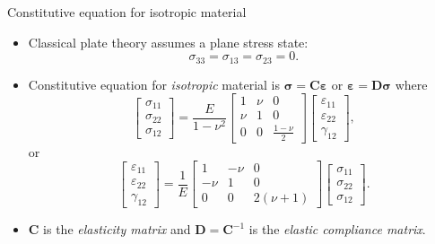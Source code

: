 \documentclass[aspectratio=169]{beamer}
\begin{document}
\begin{frame}{Constitutive equation for isotropic material}
  \vspace{-0.3cm}
  \begin{itemize}
    \item  Classical plate theory assumes a plane stress state:  $$\sigma_{33} = \sigma_{13} =\sigma_{23} =0.$$
    \item  Constitutive equation for \emph{isotropic} material is $\boldsymbol{\sigma}=\mathbf C\boldsymbol{\varepsilon}$ or $\boldsymbol{\varepsilon}=\mathbf D\boldsymbol{\sigma}$ where
          \[
            \begin{bmatrix}
              \sigma_{11} \\
              \sigma_{22} \\
              \sigma_{12}
            \end{bmatrix}
            =
            \frac{E}{1 - \nu^2}
            \begin{bmatrix}
              1   & \nu & 0                 \\
              \nu & 1   & 0                 \\
              0   & 0   & \frac{1 - \nu}{2}
            \end{bmatrix}
            \begin{bmatrix}
              \varepsilon_{11} \\
              \varepsilon_{22} \\
              \gamma_{12}
            \end{bmatrix},
          \]
          or
          \[
            \begin{bmatrix}
              \varepsilon_{11} \\
              \varepsilon_{22} \\
              \gamma_{12}
            \end{bmatrix}
            =
            \frac{1}{E}
            \begin{bmatrix}
              1    & -\nu & 0          \\
              -\nu & 1    & 0          \\
              0    & 0    & 2(\nu + 1)
            \end{bmatrix}
            \begin{bmatrix}
              \sigma_{11} \\
              \sigma_{22} \\
              \sigma_{12}
            \end{bmatrix}.
          \]
    \item $\mathbf C$ is the \emph{elasticity matrix} and $\mathbf D=\mathbf C^{-1}$ is the \emph{elastic compliance matrix}.
  \end{itemize}
\end{frame}
\end{document}
